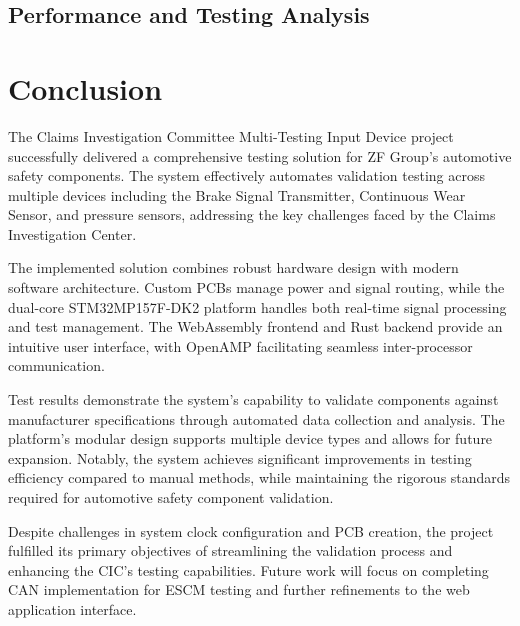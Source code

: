\documentclass[12pt]{article}
\begin{document}
\subsection{Performance and Testing Analysis}


\pagebreak
\section{Conclusion}

The Claims Investigation Committee Multi-Testing Input Device project
successfully delivered a comprehensive testing solution for ZF Group's
automotive safety components. The system effectively automates validation
testing across multiple devices including the Brake Signal Transmitter,
Continuous Wear Sensor, and pressure sensors, addressing the key challenges
faced by the Claims Investigation Center.

The implemented solution combines robust hardware design with modern software
architecture. Custom PCBs manage power and signal routing, while the dual-core
STM32MP157F-DK2 platform handles both real-time signal processing and test
management. The WebAssembly frontend and Rust backend provide an intuitive user
interface, with OpenAMP facilitating seamless inter-processor communication.

Test results demonstrate the system's capability to validate components against
manufacturer specifications through automated data collection and analysis. The
platform's modular design supports multiple device types and allows for future
expansion. Notably, the system achieves significant improvements in testing
efficiency compared to manual methods, while maintaining the rigorous standards
required for automotive safety component validation.

Despite challenges in system clock configuration and PCB creation, the project
fulfilled its primary objectives of streamlining the validation process and
enhancing the CIC's testing capabilities. Future work will focus on completing
CAN implementation for ESCM testing and further refinements to the web
application interface.
\end{document}

